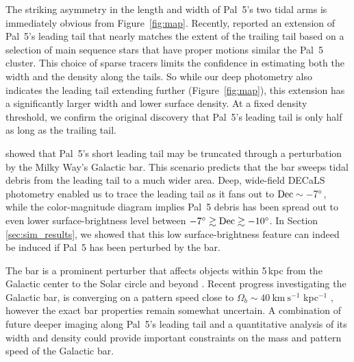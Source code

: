\documentclass[twocolumn]{aastex62}
\newcommand{\kms}{\ensuremath{\textrm{km}~\textrm{s}^{-1}}}
\begin{document}
The striking asymmetry in the length and width of Pal~5's two tidal arms is immediately obvious from Figure~\ref{fig:map}.
Recently, \citet{Starkman:2019} reported an extension of Pal~5's leading tail that nearly matches the extent of the trailing tail based on a selection of main sequence stars that have proper motions similar the Pal~5 cluster.
This choice of sparse tracers limits the confidence in estimating both the width and the density along the tails.
So while our deep photometry also indicates the leading tail extending further (Figure~\ref{fig:map}), this extension has a significantly larger width and lower surface density.
At a fixed density threshold, we confirm the original \citet{Bernard:2016} discovery that Pal~5's leading tail is only half as long as the trailing tail.

\citet{Pearson:2017} showed that Pal~5's short leading tail may be truncated through a perturbation by the Milky Way's Galactic bar.
This scenario predicts that the bar sweeps tidal debris from the leading tail to a much wider area.
Deep, wide-field DECaLS photometry enabled us to trace the leading tail as it fans out to $\rm Dec\sim-7^\circ$, while the color-magnitude diagram implies Pal~5 debris has been spread out to even lower surface-brightness level between $-7^\circ\gtrsim\rm Dec\gtrsim-10^\circ$.
In Section \ref{sec:sim_results}, we showed that this low surface-brightness feature can indeed be induced if Pal~5 has been perturbed by the bar.

The bar is a prominent perturber that affects objects within 5\,kpc from the Galactic center \citep[e.g., the Ophiuchus stream,][]{Price-Whelan:2016b, Hattori:2016} to the Solar circle and beyond \citep[e.g., local phase-space overdensities][]{Hunt:2018, Monari:2019}.
Recent progress investigating the Galactic bar, is converging on a pattern speed close to $\Omega_b \sim 40 ~\kms$ kpc$^{-1}$ \citep[e.g.,][]{Clarke:2019, Sanders:2019, Bovy:2019}, however the exact bar properties remain somewhat uncertain.
A combination of future deeper imaging along Pal~5's leading tail and a quantitative analysis of its width and density could provide important constraints on the mass and pattern speed of the Galactic bar.
\end{document}
